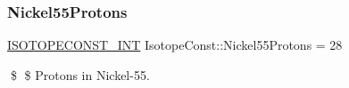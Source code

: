 \subsubsection{\texorpdfstring{Nickel55\+Protons}{Nickel55Protons}}
{\footnotesize\ttfamily \mbox{\hyperlink{group___isotope_const-_macros_ga5f18360b3e99483a35c32d789e62621c}{I\+S\+O\+T\+O\+P\+E\+C\+O\+N\+S\+T\+\_\+\+I\+NT}} Isotope\+Const\+::\+Nickel55\+Protons = 28}

\$ \$ Protons in Nickel-\/55. 